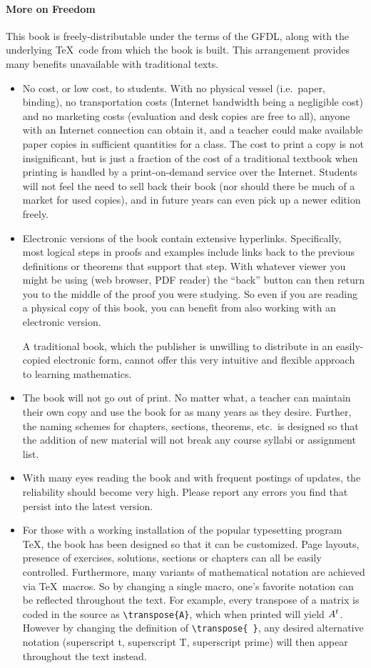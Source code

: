 \paragraph{More on Freedom}
%
This book is freely-distributable under the terms of the GFDL, along with the underlying \TeX\ code from which the book is built.  This arrangement provides many benefits unavailable with traditional texts.
%
\begin{itemize}
%
\item  No cost, or low cost, to students.  With no physical vessel (i.e.\ paper, binding), no transportation costs (Internet bandwidth being a negligible cost) and no marketing costs (evaluation and desk copies are free to all), anyone with an Internet connection can obtain it, and a teacher could make available paper copies in sufficient quantities for a class.  The cost to print a copy is not insignificant, but is just a fraction of the cost of a traditional textbook when printing is handled by a print-on-demand service over the Internet.  Students will not feel the need to sell back their book (nor should there be much of a market for used copies), and in future years can even pick up a newer edition freely.
%
\item Electronic versions of the book contain extensive hyperlinks.  Specifically, most logical steps in proofs and examples include links back to the previous definitions or theorems that support that step.  With whatever viewer you might be using (web browser, PDF reader) the ``back'' button can then return you to the middle of the proof you were studying.  So even if you are reading a physical copy of this book, you can benefit from also working with an electronic version.\par
%
A traditional book, which the publisher is unwilling to distribute in an easily-copied electronic form, cannot offer this very intuitive and flexible approach to learning mathematics.
%
\item The book will not go out of print.  No matter what, a teacher can maintain their own copy and use the book for as many years as they desire.  Further, the naming schemes for chapters, sections, theorems, etc.\ is designed so that the addition of new material will not break any course syllabi or assignment list.
%
\item  With many eyes reading the book and with frequent postings of updates, the reliability should become very high.  Please report any errors you find that persist into the latest version.
%
\item  For those with a working installation of the popular typesetting program \TeX, the book has been designed so that it can be customized.  Page layouts, presence of exercises, solutions, sections or chapters can all be easily controlled.  Furthermore, many variants of mathematical notation are achieved via \TeX\ macros.  So by changing a single macro, one's favorite notation can be reflected throughout the text.  For example, every transpose of a matrix is coded in the source as {\tt\verb!\transpose{A}!}, which when printed will yield $A\sp{t}$.  However by changing the definition of {\tt\verb!\transpose{ }!}, any desired alternative notation (superscript t, superscript T, superscript prime) will then appear throughout the text instead.

\end{itemize}
